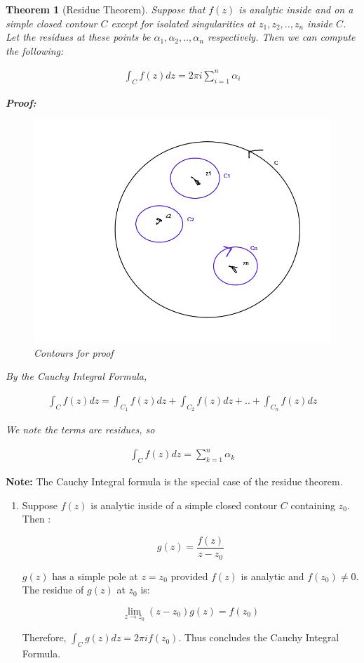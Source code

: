 \documentclass{article}
\newtheorem{theorem}{Theorem}[section]
\theoremstyle{definition}
\begin{document}
\begin{theorem}[Residue Theorem]
Suppose that $f(z)$ is analytic inside and on a simple closed contour $C$ except for isolated singularities at $z_1, z_2,..,z_n$ inside $C$. Let the residues at these points be $\alpha_1, \alpha_2,..,\alpha_n$ respectively. Then we can compute the following:


\begin{align}
\int_C f(z) dz = 2 \pi i \sum_{i=1}^n \alpha_i
\end{align}

\textbf{Proof:}

\begin{figure}[H]
	\centering
	\includegraphics[width=0.5\linewidth]{cnn}
	\caption{Contours for proof}
	\label{fig:cnn}
\end{figure}


By the Cauchy Integral Formula, 

\begin{align}
\int_C f(z) dz = \int_{C_1} f(z) dz + \int_{C_2} f(z) dz + .. + \int_{C_n} f(z) dz
\end{align}

We note the terms are residues, so 

\begin{align}
\int_C f(z) dz = \sum_{k=1}^n \alpha_k 
\end{align}


\end{theorem}

\textbf{Note:} The Cauchy Integral formula is the special case of the residue theorem.

\begin{enumerate}
	\item Suppose $f(z)$ is analytic inside of a simple closed contour $C$ containing $z_0$. Then :
	
	$$g(z) = \frac{f(z)}{z-z_0}$$
	
	$g(z)$ has a simple pole at $z=z_0$ provided $f(z)$ is analytic and $f(z_0) \neq 0$. The residue of $g(z)$ at $z_0$ is:
	
	$$\lim_{z \to z_0}(z-z_0)g(z) = f(z_0)$$
	
	Therefore, $\int_C g(z) dz = 2 \pi i f(z_0)$. Thus concludes the Cauchy Integral Formula. 
\end{enumerate}
\end{document}
